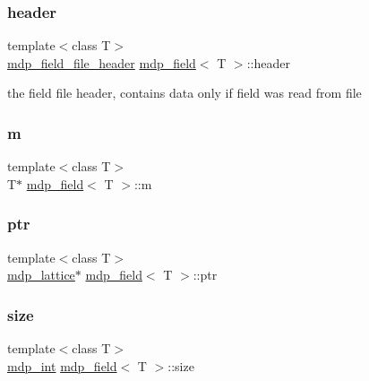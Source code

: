 \mbox{\label{classmdp__field_a465dfc6a95fe7ca5016595550cd024d9}} 
\subsubsection{\texorpdfstring{header}{header}}
{\footnotesize\ttfamily template$<$class T$>$ \\
\hyperlink{classmdp__field__file__header}{mdp\+\_\+field\+\_\+file\+\_\+header} \hyperlink{classmdp__field}{mdp\+\_\+field}$<$ T $>$\+::header}



the field file header, contains data only if field was read from file 

\mbox{\label{classmdp__field_a4d38ed40feef11c07d751fc276a498fc}} 
\subsubsection{\texorpdfstring{m}{m}}
{\footnotesize\ttfamily template$<$class T$>$ \\
T$\ast$ \hyperlink{classmdp__field}{mdp\+\_\+field}$<$ T $>$\+::m\hspace{0.3cm}{\ttfamily [protected]}}

\mbox{\label{classmdp__field_aa3e7e522a6e3c47da7ff7075d71f6417}} 
\subsubsection{\texorpdfstring{ptr}{ptr}}
{\footnotesize\ttfamily template$<$class T$>$ \\
\hyperlink{classmdp__lattice}{mdp\+\_\+lattice}$\ast$ \hyperlink{classmdp__field}{mdp\+\_\+field}$<$ T $>$\+::ptr\hspace{0.3cm}{\ttfamily [protected]}}

\mbox{\label{classmdp__field_a3dfa0ff545bed811ad055e46020bed7f}} 
\subsubsection{\texorpdfstring{size}{size}}
{\footnotesize\ttfamily template$<$class T$>$ \\
\hyperlink{mdp__global__vars_8h_aaa1ad9d0dcd2124aa5af0120d9954174}{mdp\+\_\+int} \hyperlink{classmdp__field}{mdp\+\_\+field}$<$ T $>$\+::size\hspace{0.3cm}{\ttfamily [protected]}}

